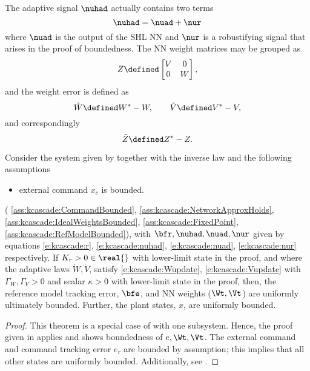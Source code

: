 %
The adaptive signal $\nuhad$ actually contains two terms
\begin{equation*}
\nuhad = \nuad + \nur
\end{equation*}
where $\nuad$ is the output of the SHL NN and $\nur$ is a
robustifying signal that arises in the proof of boundedness. The NN
weight matrices may be grouped as
\begin{equation*}
Z \defined \begin{bmatrix}V & 0 \\ 0 & W\end{bmatrix},
\end{equation*} and the weight error is defined as
\begin{equation*}
\tilde{W}\defined W^*-W,\qquad \tilde{V}\defined V^*-V,
\end{equation*}
and correspondingly
\begin{equation*}
\tilde{Z}\defined Z^*-Z.
\end{equation*}
%
\begin{theorem}
\label{thm:simple:ebounded} Consider the system given by
 together with the inverse law
 and the following assumptions

\begin{itemize}
\item external command $x_c$ is bounded.
\end{itemize} (
\ref{ass:kcascade:CommandBounded},
\ref{ass:kcascade:NetworkApproxHolds},
\ref{ass:kcascade:IdealWeightsBounded},
\ref{ass:kcascade:FixedPoint}, \ref{ass:kcascade:RefModelBounded}),
with $\bfr, \nuhad, \nuad, \nur$ given by equations
\ref{e:kcascade:r}, \ref{e:kcascade:nuhad},
 \ref{e:kcascade:nuad}, \ref{e:kcascade:nur} respectively. If
$K_r > 0 \in \real{}$ with lower-limit state in the proof, and where
the adaptive laws $\dot{W},\dot{V}$, satisfy
\ref{e:kcascade:Wupdate}, \ref{e:kcascade:Vupdate} with
$\Gamma_W,\Gamma_V > 0$ and scalar $\kappa > 0$ with lower-limit
state in the proof, then, the reference model tracking error,
$\bfe$, and NN weights ($\Wt,\Vt$) are uniformly ultimately bounded.
Further, the plant states, $x$, are uniformly bounded.
\begin{proof}
This theorem is a special case of
 with one subsystem. Hence, the
proof given in  applies and shows boundedness of
$e,\Wt,\Vt$. The external command and command tracking error $e_r$
are bounded by assumption; this implies that all other states are
uniformly bounded. Additionally, see \cite{johnson:phdthesis}.
\end{proof}
\end{theorem}
